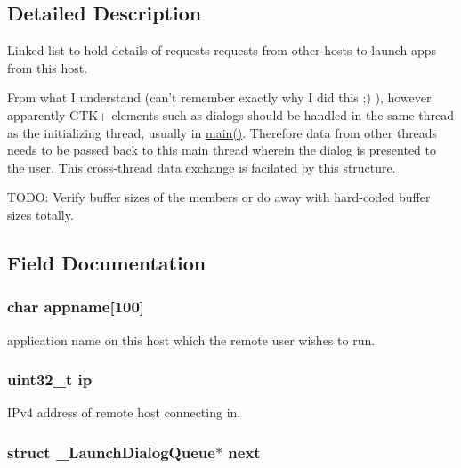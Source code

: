 \subsection{\-Detailed \-Description}
\-Linked list to hold details of requests requests from other hosts to launch apps from this host. 

\-From what \-I understand (can't remember exactly why \-I did this ;) ), however apparently \-G\-T\-K+ elements such as dialogs should be handled in the same thread as the initializing thread, usually in \hyperlink{main_8c_a0ddf1224851353fc92bfbff6f499fa97}{main()}. \-Therefore data from other threads needs to be passed back to this main thread wherein the dialog is presented to the user. \-This cross-\/thread data exchange is facilated by this structure.

\-T\-O\-D\-O\-: \-Verify buffer sizes of the members or do away with hard-\/coded buffer sizes totally. 

\subsection{\-Field \-Documentation}
\hypertarget{struct___launch_dialog_queue_aa9bb8e0298777697761f6c5d34032a78}{
\subsubsection[{appname}]{\setlength{\rightskip}{0pt plus 5cm}char {\bf appname}\mbox{[}100\mbox{]}}}\label{struct___launch_dialog_queue_aa9bb8e0298777697761f6c5d34032a78}


application name on this host which the remote user wishes to run. 

\hypertarget{struct___launch_dialog_queue_a69ddb9c845da426f636d9dd0dbed4e7e}{
\subsubsection[{ip}]{\setlength{\rightskip}{0pt plus 5cm}uint32\-\_\-t {\bf ip}}}\label{struct___launch_dialog_queue_a69ddb9c845da426f636d9dd0dbed4e7e}


\-I\-Pv4 address of remote host connecting in. 

\hypertarget{struct___launch_dialog_queue_a4a84428c2db73786a25a86dec566e549}{
\subsubsection[{next}]{\setlength{\rightskip}{0pt plus 5cm}struct {\bf \-\_\-\-Launch\-Dialog\-Queue}$\ast$ {\bf next}}}\label{struct___launch_dialog_queue_a4a84428c2db73786a25a86dec566e549}


